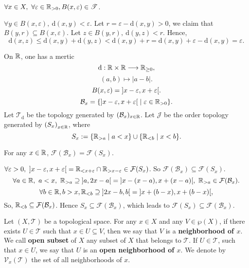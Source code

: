 \begin{propositionenv}
    $\forall x\in X,\ \forall \varepsilon\in \mathbb{R}_{>0}, B(x,\varepsilon)\in \mathscr{T}$.
\end{propositionenv}
\begin{proofenv}
    $\forall y\in B(x,\varepsilon),\ \mathrm{d}(x,y)<\varepsilon$. Let $r=\varepsilon-\mathrm{d}(x,y)>0$, we claim that $B(y,r)\subseteq B(x,\varepsilon)$. Let $z\in B(y,r), \ \mathrm{d}(y,z)<r$. Hence,
    $$\mathrm{d}(x,z)\le \mathrm{d}(x,y)+\mathrm{d}(y,z)<\mathrm{d}(x,y)+r=\mathrm{d}(x,y)+\varepsilon -\mathrm{d}(x,y)=\varepsilon.$$
\end{proofenv}
\begin{remark}
    On $\mathbb{R}$, one has a mertic 
    $$\mathrm{d}: \mathbb{R}\times \mathbb{R}\longrightarrow \mathbb{R}_{\ge 0},$$
    $$\left(a,b\right)\longmapsto |a-b|.$$
    $$B(x,\varepsilon)=\interval[open]{x-\varepsilon}{x+\varepsilon}.$$
    $$\mathcal{B}_x=\{\interval[open]{x-\varepsilon}{x+\varepsilon}\mid \varepsilon\in \RR_{>0}\}.$$
    Let $\mathscr{T}_\mathrm{d}$ be the topology generated by $(\mathcal{B}_x)_{x\in \mathbb{R}}$. Let $\mathscr{J}$ be the order topology generated by $\left(S_x\right)_{x\in \mathbb{R}}$, where 
    $$S_x:=\{\mathbb{R}_{>a}\mid a<x\}\cup \{\mathbb{R}_{<b}\mid x<b\}.$$
\end{remark}
\begin{propositionenv}
    For any $x\in \mathbb{R}$, $\mathcal{F}(\mathcal{B}_x)=\mathcal{F}(S_x)$.
\end{propositionenv}
\begin{proofenv}
    $\forall \varepsilon>0,\ \interval[open]{x-\varepsilon}{x+\varepsilon}=\RR_{<x+\varepsilon}\cap \RR_{>x-\varepsilon}\in \mathcal{F}(S_x)$. So $\mathcal{F}(\mathcal{B}_x)\subseteq \mathcal{F}(S_x)$.
    $$\forall a\in \RR,\ a<x,\ \RR_{>a}\supseteq \interval[open]{a}{2x-a}=\interval[open]{x-(x-a)}{x+(x-a)},\ \RR_{>a}\in \mathcal{F}(\mathcal{B}_x).$$
    $$\forall b\in \RR, b>x,\RR_{<b}\supseteq \interval[open]{2x-b}{b}=\interval[open]{x+(b-x)}{x+(b-x)},$$
    So, $\mathbb{R}_{<b}\subseteq\mathcal{F}(\mathcal{B}_x)$. Hence $S_x\subseteq \mathcal{F}(\mathcal{B}_x)$, which leads to $\mathcal{F}(S_x)\subseteq\mathcal{F}(\mathcal{B}_x)$.
\end{proofenv}
\begin{definitionenv}
    Let $(X,\mathscr{T})$ be a topological space. For any $x\in X$ and any $V\in \wp(X)$, if there exists $U\in \mathscr{T}$ such that $x\in U\subseteq V$, then we say that $V$ is a \textbf{neighborhood of $x$}. We call \textbf{open subset} of $X$ any subset of $X$ that belongs to $\mathscr{T}$. If $U\in \mathscr{T}$, such that $x\in U$, we say that $U$ is an \textbf{open neighborhood of $x$}. We denote by $\mathcal{V}_x(\mathscr{T})$ the set of all neighborhoods of $x$.
\end{definitionenv}
